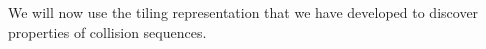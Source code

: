We will now use the tiling representation that we have developed to discover properties of collision sequences.
